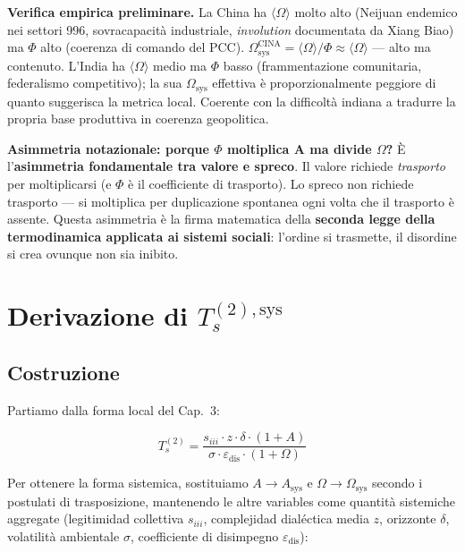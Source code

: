 \Proved{} \textbf{Verifica empirica preliminare.} La China ha
\(\langle \Omega \rangle\) molto alto (Neijuan endemico nei settori 996,
sovracapacità industriale, \emph{involution} documentata da Xiang Biao)
ma \(\Phi\) alto (coerenza di comando del PCC).
\(\Omega_{\text{sys}}^{\text{CINA}} = \langle\Omega\rangle/\Phi \approx \langle\Omega\rangle\)
--- alto ma contenuto. L'India ha \(\langle \Omega \rangle\) medio ma
\(\Phi\) basso (frammentazione comunitaria, federalismo competitivo); la
sua \(\Omega_{\text{sys}}\) effettiva è proporzionalmente peggiore di
quanto suggerisca la metrica local. Coerente con la difficoltà indiana
a tradurre la propria base produttiva in coerenza geopolitica.

\Conj{} \textbf{Asimmetria notazionale: porque $\Phi$ moltiplica A ma divide
$\Omega$?} È l'\textbf{asimmetria fondamentale tra valore e spreco}. Il valore
richiede \emph{trasporto} per moltiplicarsi (e \(\Phi\) è il
coefficiente di trasporto). Lo spreco non richiede trasporto --- si
moltiplica per duplicazione spontanea ogni volta che il trasporto è
assente. Questa asimmetria è la firma matematica della \textbf{seconda
legge della termodinamica applicata ai sistemi sociali}: l'ordine si
trasmette, il disordine si crea ovunque non sia inibito.



\section{\texorpdfstring{Derivazione di
\(T_s^{(2),\text{sys}}\)}{Derivazione di T\_s\^{}\{(2),\textbackslash text\{sys\}\}}}\label{se derivazione-di-t_s2textsys}

\subsection{Costruzione}\label{costruzione}

Partiamo dalla forma local del Cap.~3:

\[
T_s^{(2)} = \frac{s_{iii} \cdot z \cdot \delta \cdot (1 + A)}{\sigma \cdot \varepsilon_{\text{dis}} \cdot (1 + \Omega)}
\]

Per ottenere la forma sistemica, sostituiamo \(A \to A_{\text{sys}}\) e
\(\Omega \to \Omega_{\text{sys}}\) secondo i postulati di trasposizione,
mantenendo le altre variables come quantità sistemiche aggregate
(legitimidad collettiva \(s_{iii}\), complejidad dialéctica media \(z\),
orizzonte \(\delta\), volatilità ambientale \(\sigma\), coefficiente di
disimpegno \(\varepsilon_{\text{dis}}\)):

